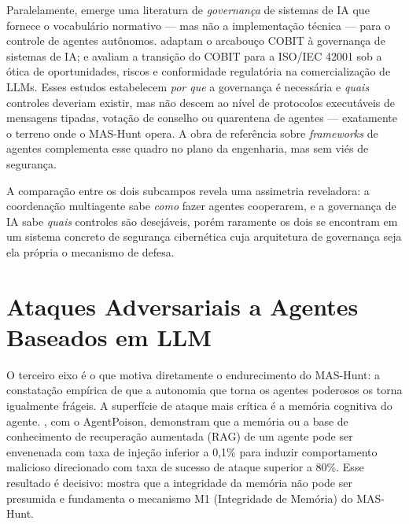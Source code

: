 Paralelamente, emerge uma literatura de \textit{governança} de sistemas de IA que
fornece o vocabulário normativo --- mas não a implementação técnica --- para o
controle de agentes autônomos.  adaptam o
arcabouço COBIT à governança de sistemas de IA;  e
 avaliam a transição do COBIT para a ISO/IEC 42001 sob a
ótica de oportunidades, riscos e conformidade regulatória na comercialização de
LLMs. Esses estudos estabelecem \textit{por que} a governança é necessária e
\textit{quais} controles deveriam existir, mas não descem ao nível de protocolos
executáveis de mensagens tipadas, votação de conselho ou quarentena de agentes ---
exatamente o terreno onde o MAS-Hunt opera. A obra de referência sobre
\textit{frameworks} de agentes \cite{guo2024survey} complementa esse quadro no
plano da engenharia, mas sem viés de segurança.

A comparação entre os dois subcampos revela uma assimetria reveladora: a
coordenação multiagente sabe \textit{como} fazer agentes cooperarem, e a
governança de IA sabe \textit{quais} controles são desejáveis, porém raramente os
dois se encontram em um sistema concreto de segurança cibernética cuja
arquitetura de governança seja ela própria o mecanismo de defesa.

\section{Ataques Adversariais a Agentes Baseados em LLM}
\label{sec:rel-ataques-adversariais}

O terceiro eixo é o que motiva diretamente o endurecimento do MAS-Hunt: a
constatação empírica de que a autonomia que torna os agentes poderosos os torna
igualmente frágeis. A superfície de ataque mais crítica é a memória cognitiva do
agente. , com o AgentPoison, demonstram que a
memória ou a base de conhecimento de recuperação aumentada (RAG) de um agente
pode ser envenenada com taxa de injeção inferior a 0{,}1\% para induzir
comportamento malicioso direcionado com taxa de sucesso de ataque superior a
80\%. Esse resultado é decisivo: mostra que a integridade da memória não pode ser
presumida e fundamenta o mecanismo M1 (Integridade de Memória) do MAS-Hunt.

